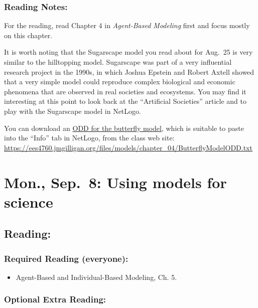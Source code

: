 \documentclass[
]{article}
\providecommand{\tightlist}{%
  \setlength{\itemsep}{0pt}\setlength{\parskip}{0pt}}
\begin{document}
\subsubsection{Reading Notes:}\label{reading-notes-3}

For the reading, read Chapter 4 in \emph{Agent-Based Modeling} first and
focus mostly on this chapter.

It is worth noting that the Sugarscape model you read about for Aug.~25
is very similar to the hilltopping model. Sugarscape was part of a very
influential research project in the 1990s, in which Joshua Epstein and
Robert Axtell showed that a very simple model could reproduce complex
biological and economic phenomena that are observed in real societies
and ecosystems. You may find it interesting at this point to look back
at the ``Artificial Societies'' article and to play with the Sugarscape
model in NetLogo.

You can download an
\href{/files/models/chapter_04/ButterflyModelODD.txt}{ODD for the
butterfly model}, which is suitable to paste into the ``Info'' tab in
NetLogo, from the class web site:
\url{https://ees4760.jmgilligan.org/files/models/chapter_04/ButterflyModelODD.txt}

\section{Mon., Sep.~8: Using models for
science}\label{mon.-sep.-8-using-models-for-science}

\subsection{Reading:}\label{reading-5}

\subsubsection{Required Reading
(everyone):}\label{required-reading-everyone-4}

\begin{itemize}
\tightlist
\item
  Agent-Based and Individual-Based Modeling, Ch. 5.
\end{itemize}

\subsubsection{Optional Extra Reading:}\label{optional-extra-reading-2}
\end{document}
